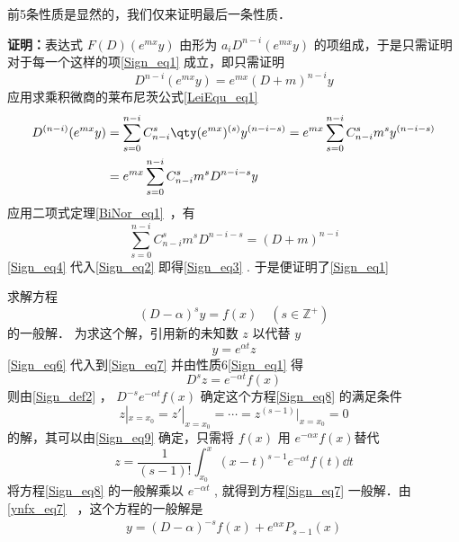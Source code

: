 前5条性质是显然的，我们仅来证明最后一条性质．

\textbf{证明：}表达式 $F(D)(e^{mx}y)$ 由形为 $a_{i}D^{n-i}(e^{mx}y)$ 的项组成，于是只需证明对于每一个这样的项\autoref{Sign_eq1} 成立，即只需证明
\begin{equation}\label{Sign_eq3}
D^{n-i}(e^{mx}y)=e^{mx}(D+m)^{n-i}y
\end{equation}
应用求乘积微商的莱布尼茨公式\autoref{LeiEqu_eq1}~
\begin{equation}\label{Sign_eq2}
\begin{aligned}
D^{(n-i)}(e^{mx}y)&=\sum_{s=0}^{n-i}C_{n-i}^s\qty(e^{mx})^{(s)}y^{(n-i-s)}=e^{mx}\sum_{s=0}^{n-i}C_{n-i}^sm^sy^{(n-i-s)}\\
&=e^{mx}\sum_{s=0}^{n-i}C_{n-i}^sm^sD^{n-i-s}y
\end{aligned}
\end{equation}
应用二项式定理\autoref{BiNor_eq1}~，有
\begin{equation}\label{Sign_eq4}
\sum_{s=0}^{n-i}C_{n-i}^sm^sD^{n-i-s}=(D+m)^{n-i}
\end{equation}
\autoref{Sign_eq4}  代入\autoref{Sign_eq2} 即得\autoref{Sign_eq3} . 于是便证明了\autoref{Sign_eq1} 

\begin{example}{}
求解方程
\begin{equation}\label{Sign_eq7}
(D-\alpha)^sy=f(x) \quad (s\in \mathbb{Z}^{+})
\end{equation}
的一般解．
为求这个解，引用新的未知数 $z$ 以代替 $y$
\begin{equation}\label{Sign_eq6}
y=e^{\alpha t}z
\end{equation}
\autoref{Sign_eq6} 代入到\autoref{Sign_eq7} 并由性质6\autoref{Sign_eq1} 得
\begin{equation}\label{Sign_eq8}
D^sz=e^{-\alpha t}f(x)
\end{equation}
则由\autoref{Sign_def2} ， $D^{-s}e^{-\alpha t}f(x)$ 确定这个方程\autoref{Sign_eq8} 的满足条件
\begin{equation}
z|_{x=x_0}=z'|_{x=x_0}=\cdots=z^{(s-1)}|_{x=x_0}=0
\end{equation}
的解，其可以由\autoref{Sign_eq9} 确定，只需将 $f(x)$ 用 $e^{-\alpha x}f(x)$替代
\begin{equation}
z=\frac{1}{(s-1)!}\int_{x_0}^x(x-t)^{s-1}e^{-\alpha t}f(t)\dd t
\end{equation}
将方程\autoref{Sign_eq8} 的一般解乘以 $e^{-\alpha t}$ , 就得到方程\autoref{Sign_eq7} 一般解．由\autoref{ynfx_eq7}~ ，这个方程的一般解是
\begin{equation}
\begin{aligned}
y=(D-\alpha)^{-s}f(x)+e^{\alpha x}P_{s-1}(x)
\end{aligned}
\end{equation}

\end{example}

